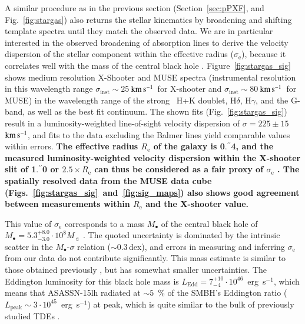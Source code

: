 \documentclass[traditabstract]{aa}
\newcommand{\farc}{\hbox{$.\!\!^{\prime\prime}$}}
\newcommand{\kms}{$\rm{km\,s^{-1}}$}
\newcommand{\hg}{H$\gamma$}
\newcommand{\hd}{H$\delta$}
\begin{document}
A similar procedure as in the previous section (Section~\ref{sec:pPXF}, and Fig.~\ref{fig:stargas}) also returns the stellar kinematics by broadening and shifting template spectra until they match the observed data. We are in particular interested in the observed broadening of absorption lines to derive the velocity dispersion of the stellar component within the effective radius ($\sigma_{\mathrm{e}}$), because it correlates well with the mass of the central black hole \citep{2000ApJ...539L...9F, 2000ApJ...539L..13G}. Figure~\ref{fig:stargas_sig} shows medium resolution X-Shooter and MUSE spectra (instrumental resolution in this wavelength range $\sigma_{\mathrm{inst}}\sim25$\,\kms~for X-shooter and $\sigma_{\mathrm{inst}}\sim80$\,\kms~for MUSE) in the wavelength range of the strong ~H+K doublet, \hd, \hg, and the G-band, as well as the best fit continuum. The shown fits (Fig.~\ref{fig:stargas_sig}) result in a luminosity-weighted line-of-sight velocity dispersion of $\sigma=225\pm15$\,\kms, and fits to the data excluding the Balmer lines yield comparable values within errors. \textbf{The effective radius $R_{\mathrm{e}}$ of the galaxy is 0\farc{4}, and the measured luminosity-weighted velocity dispersion within the X-shooter slit of 1\farc{0} or $2.5 \times R_{\mathrm{e}}$ can thus be considered as a fair proxy of $\sigma_{\mathrm{e}}$ \citep{2000ApJ...539L..13G}. The spatially resolved data from the MUSE data cube (Figs.~\ref{fig:stargas_sig}~and~\ref{fig:sig_maps}) also shows good agreement between measurements within $R_{\mathrm{e}}$ and the X-shooter value.}

This value of $\sigma_{\mathrm{e}}$ corresponds to a mass $M_\bullet$ of the central black hole of $M_\bullet = 5.3_{-3.0}^{+8.0}\cdot10^{8} M_\sun$ \citep[Eq. 3, 5 or 7 in][]{2013ARA&A..51..511K}. The quoted uncertainty is dominated by the intrinsic scatter in the $M_\bullet$-$\sigma$ relation ($\sim0.3$\,dex), and errors in measuring and inferring $\sigma_\mathrm{e}$ from our data do not contribute significantly. This mass estimate is similar to those obtained previously \citep{2015ATel.7776....1P, 2016NatAs...1E...2L}, but has somewhat smaller uncertainties. The Eddington luminosity for this black hole mass is $L_{\mathrm{Edd}}=7_{-4}^{+10}\cdot10^{46}$~erg~s$^{-1}$, which means that ASASSN-15lh radiated at $\sim 5$~\% of the SMBH's Eddington ratio ($L_{\mathrm{peak}}\sim 3 \cdot 10^{45}$~erg~s$^{-1}$) at peak, which is quite similar to the bulk of previously studied TDEs \citep{2017ApJ...842...29H, 2017arXiv170608965W}.
\end{document}
